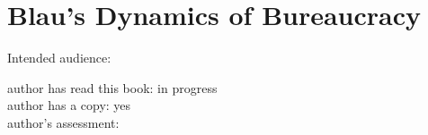 \section{Blau's Dynamics of Bureaucracy}

\cite{1955_Blau}

Intended audience:

author has read this book: in progress\\
author has a copy: yes\\
author's assessment:

